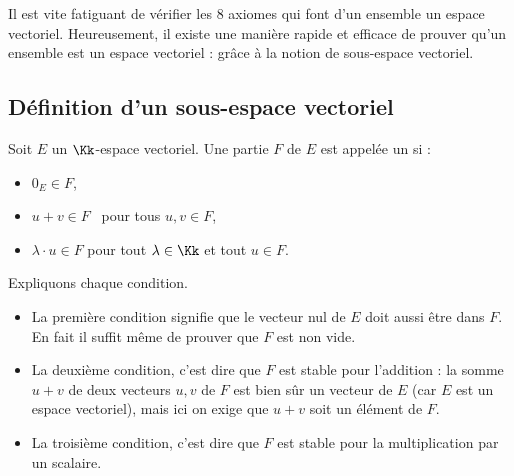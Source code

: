 \documentclass[class=report,crop=false]{standalone}
\begin{document}
Il est vite fatiguant de vérifier les $8$ axiomes qui font d'un ensemble un espace vectoriel.
Heureusement, il existe une manière rapide et efficace de prouver qu'un ensemble est un espace vectoriel :
grâce à la notion de sous-espace vectoriel.

\subsection{Définition d'un sous-espace vectoriel}

\begin{definition}
 Soit $E$ un $\Kk$-espace vectoriel. Une partie  $F$ de $E$
 est appelée un  si :
 \begin{itemize}
   \item $0_E \in F$,

   \item $u+v \in F$ \  pour tous $u,v \in F$,

   \item $\lambda \cdot u \in F$ pour tout $\lambda \in \Kk$ et tout $u \in F$.
 \end{itemize}
\end{definition}

\begin{remarque*}
Expliquons chaque condition.
\begin{itemize}
  \item La première condition signifie que le vecteur nul de $E$ doit aussi être dans $F$.
  En fait il suffit même de prouver que $F$ est non vide.

  \item La deuxième condition, c'est dire que $F$ est stable pour l'addition :
  la somme $u+v$ de deux vecteurs $u,v$ de $F$ est bien sûr un vecteur de $E$
  (car $E$ est un espace vectoriel),
  mais ici on exige que $u+v$ soit un élément de $F$.

  \item  La troisième condition, c'est dire que $F$ est
  stable pour la multiplication par un scalaire.
\end{itemize}
\end{remarque*}
\end{document}

